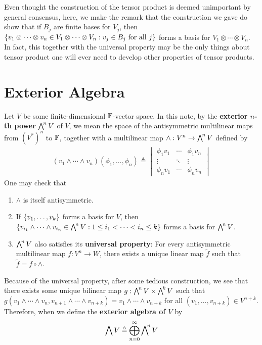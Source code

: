 \documentclass{report}
\begin{document}
Even thought the construction of the tensor product is deemed unimportant by general consensus, here, we make the remark that the construction we gave do show that if $B_j$ are finite bases for $V_j$, then  $\left\{ v_1\otimes \cdots \otimes  v_n \in V_1 \otimes  \cdots \otimes  V_n: v_j \in B_j\text{ for all }j \right\}$ forms a basis for $V_1\otimes  \cdots \otimes  V_n$. In fact, this together with the universal property may be the only things about tensor product one will ever need to develop other properties of tensor products. 
\section{Exterior Algebra}
Let $V$ be some finite-dimensional $\mathbb{F}$-vector space. In this note, by the \textbf{exterior $n$-th power} $\extp^n V$ of $V$, we mean the space of the antisymmetric multilinear maps from $(V^*)^n$ to $\mathbb{F}$, together with a multilinear map $\wedge :V^n \rightarrow \extp^n V$ defined by 
\begin{align*}
  (v_1\wedge  \cdots \wedge  v_n )(\phi_1, \dots ,\phi_n)\triangleq \begin{vmatrix} 
    \phi_1 v_1 & \cdots & \phi_1 v_n \\
    \vdots & \ddots & \vdots \\
    \phi_n v_1 & \cdots & \phi_n v_n 
  \end{vmatrix}
\end{align*}
One may check that 
\begin{enumerate}[label=(\alph*)]
  \item $\wedge$ is itself antisymmetric. 
  \item If $\left\{ v_1,\dots ,v_k \right\}$ forms a basis for $V$, then  $\set{v_{i_1}\wedge  \cdots \wedge   v_{i_n} \in \extp^n V : 1\leq i_1 < \cdots < i_n  \leq k}$ forms a basis for $\extp^n V$.
  \item $\extp^n V$ also satisfies its \textbf{universal property}: For every antisymmetric multilinear map $f:V^n \rightarrow W$, there exists a unique linear map $\tilde{f}$ such that $\tilde{f}= f \circ \wedge $.  
\end{enumerate}
Because of the universal property, after some tedious construction, we see that there exists some unique bilinear map $g:\extp^n V \times \extp^k V$ such that $g(v_1\wedge  \cdots \wedge  v_n, v_{n+1}\wedge  \cdots \wedge  v_{n+k})=v_1 \wedge  \cdots \wedge  v_{n+k}$ for all $(v_1,\dots ,v_{n+k})\in V^{n+k}$. Therefore, when we define the \textbf{exterior algebra of $V$} by
\begin{align*}
\extp V \triangleq \bigoplus_{n=0}^{\infty} \extp^n V
\end{align*}
\end{document}
